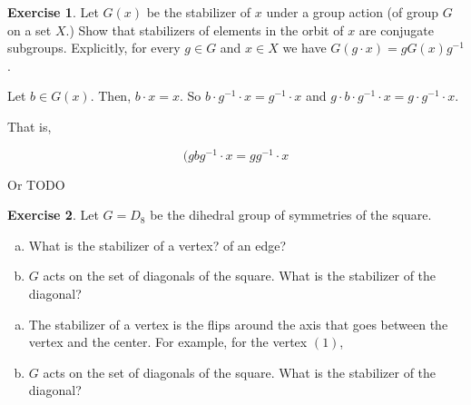 \documentclass[11pt,oneside]{article}
\numberwithin{equation}{section}
\theoremstyle{definition}
\newtheorem{exercise}{Exercise}
\begin{document}
\begin{exercise}
  Let $G(x)$ be the stabilizer of $x$ under a group action (of group $G$ on a set $X$.) Show
  that stabilizers of elements in the orbit of $x$ are conjugate subgroups. Explicitly, for
  every $g \in G$ and $x \in X$ we have $G(g \cdot x) = gG(x)g^{-1}$.
\end{exercise}
\begin{solution}
  Let $b \in G(x)$.  Then, $ b \cdot x = x$.  So $ b \cdot g^{-1} \cdot x = g^{-1} \cdot x$
  and $g \cdot b \cdot g ^ { -1} \cdot x = g \cdot g ^ { -1 } \cdot x$.

  That is,

  \[
  (gbg^{-1} \cdot x = g g^{-1} \cdot x
  \]

  Or TODO
  
\end{solution}

\begin{exercise}
  Let $G = D_8$ be the dihedral group of symmetries of the square.
  \begin{enumerate}[(a)]
    \item 
      What is the stabilizer of a vertex?  of an edge?
    \item
      $G$ acts on the set of diagonals of the square.  What is the stabilizer of the diagonal?
  \end{enumerate}
\end{exercise}
\begin{solution}
  \begin{enumerate}[(a)]
    \item 
      The stabilizer of a vertex is the flips around the axis that goes between the vertex and the center.  For example, for the vertex $(1)$,
      
    \item
      $G$ acts on the set of diagonals of the square.  What is the stabilizer of the diagonal?
  \end{enumerate}
  
\end{solution}

\begin{comment}
  \begin{exercise}
    problem
  \end{exercise}
  \begin{solution}
    \Begin{enumerate}[(a)]
    \item
      first answer
    \end{enumerate}
  \end{solution}
\end{comment}
\end{document}
